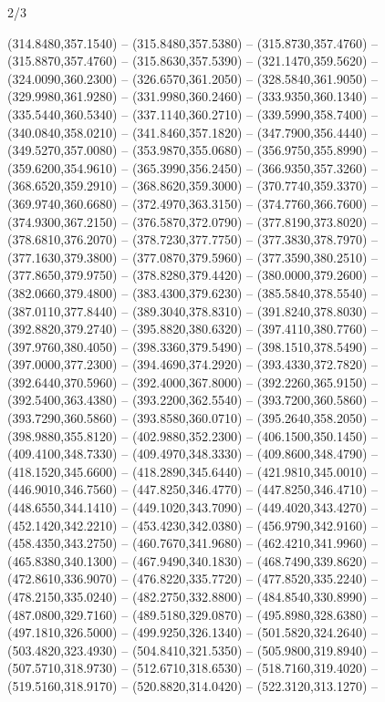\begin{flagdescription}{2/3}
\begin{scope}[xshift=0.5\flaglength]
\begin{scope}[scale=0.00209\flagwidth,yshift=170mm,xshift=-360]
\begin{scope}[y=-0.8pt, x=0.8pt, inner sep=0pt, outer sep=0pt]
  (314.8480,357.1540) -- (315.8480,357.5380) -- (315.8730,357.4760) --
  (315.8870,357.4760) -- (315.8630,357.5390) -- (321.1470,359.5620) --
  (324.0090,360.2300) -- (326.6570,361.2050) -- (328.5840,361.9050) --
  (329.9980,361.9280) -- (331.9980,360.2460) -- (333.9350,360.1340) --
  (335.5440,360.5340) -- (337.1140,360.2710) -- (339.5990,358.7400) --
  (340.0840,358.0210) -- (341.8460,357.1820) -- (347.7900,356.4440) --
  (349.5270,357.0080) -- (353.9870,355.0680) -- (356.9750,355.8990) --
  (359.6200,354.9610) -- (365.3990,356.2450) -- (366.9350,357.3260) --
  (368.6520,359.2910) -- (368.8620,359.3000) -- (370.7740,359.3370) --
  (369.9740,360.6680) -- (372.4970,363.3150) -- (374.7760,366.7600) --
  (374.9300,367.2150) -- (376.5870,372.0790) -- (377.8190,373.8020) --
  (378.6810,376.2070) -- (378.7230,377.7750) -- (377.3830,378.7970) --
  (377.1630,379.3800) -- (377.0870,379.5960) -- (377.3590,380.2510) --
  (377.8650,379.9750) -- (378.8280,379.4420) -- (380.0000,379.2600) --
  (382.0660,379.4800) -- (383.4300,379.6230) -- (385.5840,378.5540) --
  (387.0110,377.8440) -- (389.3040,378.8310) -- (391.8240,378.8030) --
  (392.8820,379.2740) -- (395.8820,380.6320) -- (397.4110,380.7760) --
  (397.9760,380.4050) -- (398.3360,379.5490) -- (398.1510,378.5490) --
  (397.0000,377.2300) -- (394.4690,374.2920) -- (393.4330,372.7820) --
  (392.6440,370.5960) -- (392.4000,367.8000) -- (392.2260,365.9150) --
  (392.5400,363.4380) -- (393.2200,362.5540) -- (393.7200,360.5860) --
  (393.7290,360.5860) -- (393.8580,360.0710) -- (395.2640,358.2050) --
  (398.9880,355.8120) -- (402.9880,352.2300) -- (406.1500,350.1450) --
  (409.4100,348.7330) -- (409.4970,348.3330) -- (409.8600,348.4790) --
  (418.1520,345.6600) -- (418.2890,345.6440) -- (421.9810,345.0010) --
  (446.9010,346.7560) -- (447.8250,346.4770) -- (447.8250,346.4710) --
  (448.6550,344.1410) -- (449.1020,343.7090) -- (449.4020,343.4270) --
  (452.1420,342.2210) -- (453.4230,342.0380) -- (456.9790,342.9160) --
  (458.4350,343.2750) -- (460.7670,341.9680) -- (462.4210,341.9960) --
  (465.8380,340.1300) -- (467.9490,340.1830) -- (468.7490,339.8620) --
  (472.8610,336.9070) -- (476.8220,335.7720) -- (477.8520,335.2240) --
  (478.2150,335.0240) -- (482.2750,332.8800) -- (484.8540,330.8990) --
  (487.0800,329.7160) -- (489.5180,329.0870) -- (495.8980,328.6380) --
  (497.1810,326.5000) -- (499.9250,326.1340) -- (501.5820,324.2640) --
  (503.4820,323.4930) -- (504.8410,321.5350) -- (505.9800,319.8940) --
  (507.5710,318.9730) -- (512.6710,318.6530) -- (518.7160,319.4020) --
  (519.5160,318.9170) -- (520.8820,314.0420) -- (522.3120,313.1270) --

\end{scope}
\end{scope}
\end{scope}
\end{flagdescription}
